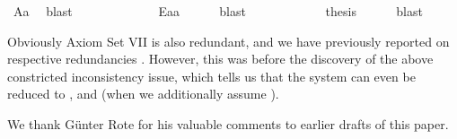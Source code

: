\begin{isabellebody}
\ A{}a\ \isamarkupfalse%
\ blast\ \isanewline
\ \ \ \ %
\ \isanewline
\ \ \ \isamarkupfalse%
\ {}{\isacharcolon}\ {\isachardoublequoteopen}E{\isacharparenleft}{\isacharparenleft}{\isasymbox}a{\isacharparenright}\isactrlbold {\isasymcdot}a{\isacharparenright}{\isachardoublequoteclose}\ \isamarkupfalse%
\ {}\ {}\ \isamarkupfalse%
\ blast\ \isanewline
\ \ \ \ %
\isanewline
\ \ \ \isamarkupfalse%
\ \isamarkupfalse%
\ {\isacharquery}thesis\ \isamarkupfalse%
\ {}\ {}\ \isamarkupfalse%
\ blast\isanewline
\ \ \isamarkupfalse%
%
\endisatagproof
{\isafoldproof}%
%
\isadelimproof
%
\endisadelimproof
%
\begin{isamarkuptext}%
Obviously Axiom Set VII is also redundant, and we have previously reported 
on respective redundancies \cite{C57}. However, this was before the discovery of the above 
constricted inconsistency issue, which tells us that the system can even be reduced 
to ,  and  (when we additionally assume ).%
\end{isamarkuptext}\isamarkuptrue%
%
\isamarkuptrue%
%
\begin{isamarkuptext}%
We thank G\"unter Rote for his valuable comments to earlier drafts of this paper.%
\end{isamarkuptext}\isamarkuptrue%
%
\isadelimtheory
%
\endisadelimtheory
%
\isatagtheory
%
\endisatagtheory
{\isafoldtheory}%
%
\isadelimtheory
%
\endisadelimtheory
%
\end{isabellebody}%
